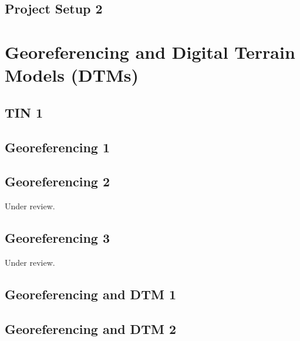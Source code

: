 \documentclass{scrartcl}
\begin{document}
\subsection{Project Setup 2}
\label{sec:project_setup_2}
\clearpage

\section{Georeferencing and Digital Terrain Models (DTMs)}
\label{sec:georeferencing_and_dtms}

\subsection{TIN 1}
\label{sec:tin_1}
\clearpage

\subsection{Georeferencing 1}
\label{sec:georeferencing_1}
\clearpage

\subsection{Georeferencing 2} %
\label{sec:georeferencing_3}
Under review.%
\clearpage

\subsection{Georeferencing 3} %
\label{sec:georeferencing_4}
Under review.%
\clearpage

\subsection{Georeferencing and DTM 1}
\label{sec:georef_tin_1}
\clearpage

\subsection{Georeferencing and DTM 2}
\label{sec:georef_tin_2}
\clearpage
\end{document}
